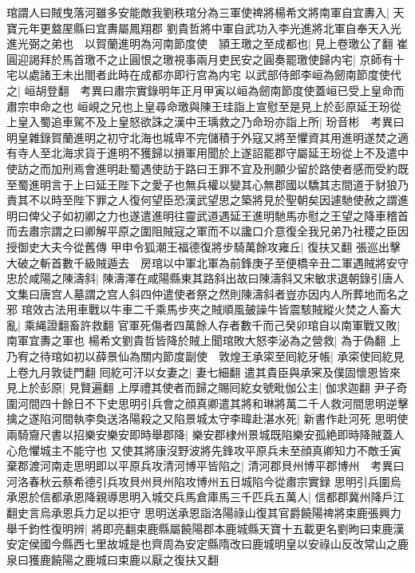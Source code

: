 琯謂人曰賊曳落河雖多安能敵我劉秩琯分為三軍使禆將楊希文將南軍自宜夀入|{
	天寶元年更盩厔縣曰宜夀屬鳳翔郡}
劉貴哲將中軍自武功入李光進將北軍自奉天入光進光弼之弟也　以賀蘭進明為河南節度使　頴王璬之至成都也|{
	見上卷璬公了翻}
崔圓迎謁拜於馬首璬不之止圓恨之璬視事兩月吏民安之圓奏罷璬使歸内宅|{
	京師有十宅以處諸王未出閤者此時在成都亦即行宫為内宅}
以武部侍郎李峘為劒南節度使代之|{
	峘胡登翻　考異曰肅宗實錄明年正月甲寅以峘為劒南節度使蓋峘已受上皇命而肅宗申命之也}
峘峴之兄也上皇尋命璬與陳王珪詣上宣慰至是見上於彭原延王玢從上皇入蜀追車駕不及上皇怒欲誅之漢中王瑀救之乃命玢亦詣上所|{
	玢音彬　考異曰明皇雜錄賀蘭進明之初守北海也城卑不完儲積于外寇又將至懼資其用進明遂焚之適有寺人至北海求貨于進明不獲歸以損軍用聞於上遂詔罷郡守屬延王玢從上不及遣中使訪之而加刑焉會進明赴蜀遇使訪于路曰王罪不宜及刑願少留於路使者感而受約既至蜀進明言于上曰延王陛下之愛子也無兵權以變其心無郡國以驕其志間道于豺狼乃責其不以時至陛下罪之人復何望臣恐漢武望思之築將見於聖朝矣因遽馳使赦之謂進明曰俾父子如初卿之力也遂遣進明往靈武道遇延王進明馳馬亦慰之王望之降車稽首而去肅宗謂之曰卿解平原之圍阻賊寇之軍而不以讒口介意復全我兄弟乃社稷之臣因授御史大夫今從舊傳}
甲申令狐潮王福德復將步騎萬餘攻雍丘|{
	復扶又翻}
張巡出擊大破之斬首數千級賊遁去　房琯以中軍北軍為前鋒庚子至便橋辛丑二軍遇賊將安守忠於咸陽之陳濤斜|{
	陳濤澤在咸陽縣東其路斜出故曰陳濤斜又宋敏求退朝錄引唐人文集曰唐宫人墓謂之宫人斜四仲遣使者祭之然則陳濤斜者豈亦因内人所葬地而名之邪}
琯效古法用車戰以牛車二千乘馬步夾之賊順風皷譟牛皆震駭賊縱火焚之人畜大亂|{
	乘䋲證翻畜許救翻}
官軍死傷者四萬餘人存者數千而己癸卯琯自以南軍戰又敗|{
	南軍宜夀之軍也}
楊希文劉貴哲皆降於賊上聞琯敗大怒李泌為之營救|{
	為于偽翻}
上乃宥之待琯如初以薛景仙為關内節度副使　敦煌王承寀至囘紇牙帳|{
	承寀使囘紇見上卷九月敦徒門翻}
囘紇可汗以女妻之|{
	妻七細翻}
遣其貴臣與承宷及僕固懷恩皆來見上於彭原|{
	見賢遍翻}
上厚禮其使者而歸之賜囘紇女號毗伽公主|{
	伽求迦翻}
尹子奇圍河間四十餘日不下史思明引兵會之顔真卿遣其將和琳將萬二千人救河間思明逆擊擒之遂陷河間執李奐送洛陽殺之又陷景城太守李暐赴湛水死|{
	新書作赴河死}
思明使兩騎齎尺書以招樂安樂安即時舉郡降|{
	樂安郡棣州景城既陷樂安孤絶即時降賊蓋人心危懼城主不能守也}
又使其將康沒野波將先鋒攻平原兵未至顔真卿知力不敵壬寅棄郡渡河南走思明即以平原兵攻清河博平皆陷之|{
	清河郡貝州博平郡博州　考異曰河洛春秋云蔡希德引兵攻貝州貝州陷攻博州五日城陷今從肅宗實録}
思明引兵圍烏承恩於信都承恩降親導思明入城交兵馬倉庫馬三千匹兵五萬人|{
	信都郡冀州降戶江翻史言烏承恩兵力足以拒守}
思明送承恩詣洛陽祿山復其官爵饒陽禆將束鹿張興力舉千鈞性復明辨|{
	將即亮翻束鹿縣屬饒陽郡本鹿城縣天寶十五載更名劉昫曰束鹿漢安定侯國今縣西七里故城是也齊周為安定縣隋改曰鹿城明皇以安祿山反改常山之鹿泉曰獲鹿饒陽之鹿城曰束鹿以厭之復扶又翻}
